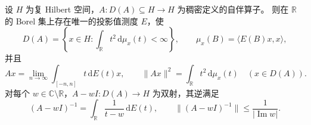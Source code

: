 \begin{theorem}[无界自伴谱定理]
\label{b1:thm:29-unbounded-spectral}
设 \(H\) 为复 Hilbert 空间，\(A:D(A)\subseteq H\to H\) 为稠密定义的自伴算子。
则在 \(\mathbb R\) 的 Borel 集上存在唯一的投影值测度 \(E\)，使
\begin{equation}\label{b1:eq:29-spectral-domain}
 D(A)=\left\{x\in H:\int_{\mathbb R}t^2\,\mathrm d\mu_x(t)<\infty\right\},
 \qquad \mu_x(B)=\langle E(B)x,x\rangle,
\end{equation}
并且
\begin{equation}\label{b1:eq:29-spectral-action}
 Ax=\lim_{n\to\infty}\int_{[-n,n]}t\,\mathrm dE(t)x,
 \qquad
 \|Ax\|^2=\int_{\mathbb R}t^2\,\mathrm d\mu_x(t)
 \quad(x\in D(A)).
\end{equation}
对每个 \(w\in\mathbb C\setminus\mathbb R\)，\(A-wI:D(A)\to H\) 为双射，其逆满足
\begin{equation}\label{b1:eq:29-unbounded-resolvent}
 (A-wI)^{-1}=\int_{\mathbb R}\frac1{t-w}\,\mathrm dE(t),\qquad
 \|(A-wI)^{-1}\|\le\frac1{|\operatorname{Im}w|}.
\end{equation}
\end{theorem}
